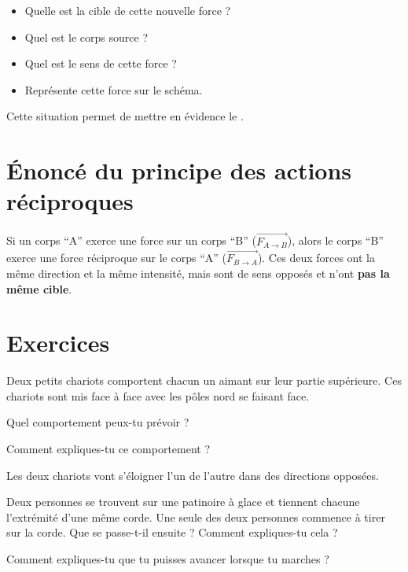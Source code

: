 \begin{itemize}
    \item Quelle est la cible de cette nouvelle force ?
    \item Quel est le corps source ?
    \item Quel est le sens de cette force ?
    \item Représente cette force sur le schéma.
\end{itemize}

Cette situation permet de mettre en évidence le .

\section{Énoncé du principe des actions réciproques}
\begin{tcolorbox}
    Si un corps \enquote{A} exerce une force sur un corps \enquote{B} (\(\vec{F_{A \rightarrow B}}\)), alors le corps \enquote{B} exerce une force réciproque sur le corps \enquote{A} (\(\vec{F_{B \rightarrow A}}\)). Ces deux forces ont la même direction et la même intensité, mais sont de sens opposés et n'ont \textbf{pas la même cible}.
\end{tcolorbox}

\section{Exercices}
\begin{exercise}
    Deux petits chariots comportent chacun un aimant sur leur partie supérieure. Ces chariots sont mis face à face avec les pôles nord se faisant face.

    Quel comportement peux-tu prévoir ?

    Comment expliques-tu ce comportement ?
\end{exercise}
\begin{solution}
    Les deux chariots vont s'éloigner l'un de l'autre dans des directions opposées.
\end{solution}

\begin{exercise}
    Deux personnes se trouvent sur une patinoire à glace et tiennent chacune l'extrémité d'une même corde. Une seule des deux personnes commence à tirer sur la corde. Que se passe-t-il ensuite ? Comment expliques-tu cela ?
\end{exercise}

\begin{exercise}
    Comment expliques-tu que tu puisses avancer lorsque tu marches ?
\end{exercise}